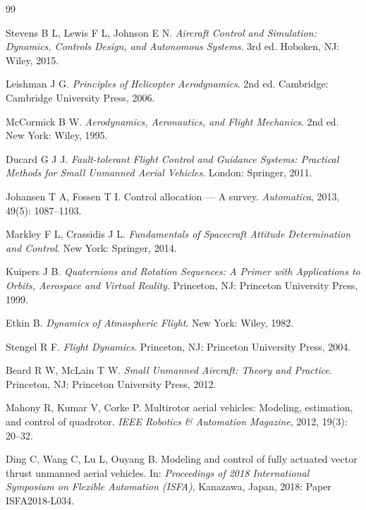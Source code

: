 \begin{thebibliography}{99}

Stevens B L, Lewis F L, Johnson E N.
\textit{Aircraft Control and Simulation: Dynamics, Controls Design, and Autonomous Systems}.
3rd ed. Hoboken, NJ: Wiley, 2015.

Leishman J G.
\textit{Principles of Helicopter Aerodynamics}.
2nd ed. Cambridge: Cambridge University Press, 2006.

McCormick B W.
\textit{Aerodynamics, Aeronautics, and Flight Mechanics}.
2nd ed. New York: Wiley, 1995.

Ducard G J J.
\textit{Fault-tolerant Flight Control and Guidance Systems: Practical Methods for Small Unmanned Aerial Vehicles}.
London: Springer, 2011.

Johansen T A, Fossen T I.
Control allocation --- A survey.
\textit{Automatica}, 2013, 49(5): 1087--1103.

Markley F L, Crassidis J L.
\textit{Fundamentals of Spacecraft Attitude Determination and Control}.
New York: Springer, 2014.

Kuipers J B.
\textit{Quaternions and Rotation Sequences: A Primer with Applications to Orbits, Aerospace and Virtual Reality}.
Princeton, NJ: Princeton University Press, 1999.

Etkin B.
\textit{Dynamics of Atmospheric Flight}.
New York: Wiley, 1982.

Stengel R F.
\textit{Flight Dynamics}.
Princeton, NJ: Princeton University Press, 2004.

Beard R W, McLain T W.
\textit{Small Unmanned Aircraft: Theory and Practice}.
Princeton, NJ: Princeton University Press, 2012.

Mahony R, Kumar V, Corke P.
Multirotor aerial vehicles: Modeling, estimation, and control of quadrotor.
\textit{IEEE Robotics \& Automation Magazine}, 2012, 19(3): 20--32.

Ding C, Wang C, Lu L, Ouyang B.
Modeling and control of fully actuated vector thrust unmanned aerial vehicles.
In: \textit{Proceedings of 2018 International Symposium on Flexible Automation (ISFA)},
Kanazawa, Japan, 2018: Paper ISFA2018-L034.


\end{thebibliography}
